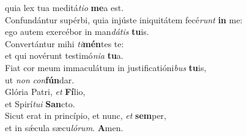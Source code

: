\oddverse quia lex tua meditá\textit{ti}\textit{o} \textbf{me}a est.\\
\evenverse Confundántur supérbi, quia injúste iniquitátem fecé\textit{runt} \textbf{in} me:~\*\\
\evenverse ego autem exercébor in man\textit{dá}\textit{tis} \textbf{tu}is.\\
\oddverse Convertántur mihi \textit{ti}\textbf{mén}tes te:~\*\\
\oddverse et qui novérunt testimó\textit{ni}\textit{a} \textbf{tu}a.\\
\evenverse Fiat cor meum immaculátum in justificatióni\textit{bus} \textbf{tu}is,~\*\\
\evenverse ut \textit{non} \textit{con}\textbf{fún}dar.\\
\oddverse Glória Patri, \textit{et} \textbf{Fí}lio,~\*\\
\oddverse et Spirí\textit{tu}\textit{i} \textbf{San}cto.\\
\evenverse Sicut erat in princípio, et nunc, \textit{et} \textbf{sem}per,~\*\\
\evenverse et in sǽcula sæcu\textit{ló}\textit{rum}. \textbf{A}men.\\
